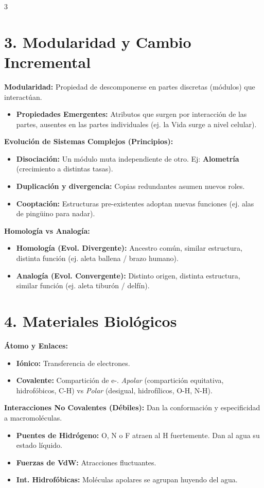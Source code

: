 \documentclass[9pt,letterpaper]{extarticle}
\begin{document}
\begin{multicols*}{3}
	\section*{3. Modularidad y Cambio Incremental}
	\textbf{Modularidad:} Propiedad de descomponerse en partes discretas (módulos) que interactúan.
	\begin{itemize}
		\item \textbf{Propiedades Emergentes:} Atributos que surgen por interacción de las partes, ausentes en las partes individuales (ej. la Vida surge a nivel celular).
	\end{itemize}
	\textbf{Evolución de Sistemas Complejos (Principios):}
	\begin{itemize}
		\item \textbf{Disociación:} Un módulo muta independiente de otro. Ej: \textbf{Alometría} (crecimiento a distintas tasas).
		\item \textbf{Duplicación y divergencia:} Copias redundantes asumen nuevos roles.
		\item \textbf{Cooptación:} Estructuras pre-existentes adoptan nuevas funciones (ej. alas de pingüino para nadar).
	\end{itemize}
	\textbf{Homología vs Analogía:}
	\begin{itemize}
		\item \textbf{Homología (Evol. Divergente):} Ancestro común, similar estructura, distinta función (ej. aleta ballena / brazo humano).
		\item \textbf{Analogía (Evol. Convergente):} Distinto origen, distinta estructura, similar función (ej. aleta tiburón / delfín).
	\end{itemize}

	\section*{4. Materiales Biológicos}
	\textbf{Átomo y Enlaces:}
	\begin{itemize}
		\item \textbf{Iónico:} Transferencia de electrones.
		\item \textbf{Covalente:} Compartición de e-. \textit{Apolar} (compartición equitativa, hidrofóbicos, C-H) vs \textit{Polar} (desigual, hidrofílicos, O-H, N-H).
	\end{itemize}
	\textbf{Interacciones No Covalentes (Débiles):} Dan la conformación y especificidad a macromoléculas.
	\begin{itemize}
		\item \textbf{Puentes de Hidrógeno:} O, N o F atraen al H fuertemente. Dan al agua su estado líquido.
		\item \textbf{Fuerzas de VdW:} Atracciones fluctuantes.
		\item \textbf{Int. Hidrofóbicas:} Moléculas apolares se agrupan huyendo del agua.
	\end{itemize}


\end{multicols*}
\end{document}
